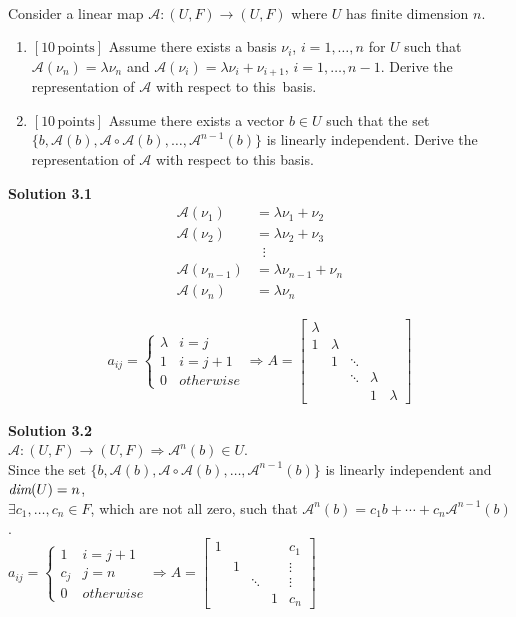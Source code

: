 \documentclass[a4paper,10.5pt]{article}
\def\dim{{\mbox{\em dim}}}
\newcommand{\A}{\mathcal{A}}
\begin{document}
\clearpage

\\
Consider a linear map $\A:(U,F) \rightarrow (U,F)$
where $U$ has finite dimension $n$. 
\begin{enumerate}
	\item {\bf$[10\, \text{points}]$} Assume there exists a basis
	$\nu_i$, $i=1, \ldots, n$ for $U$ such that ${\mathcal A}(\nu_n)=\lambda
	\nu_n$ and ${\mathcal A}(\nu_i)=\lambda \nu_i+\nu_{i+1}$, $i=1, \ldots,
	n-1$. Derive the representation of ${\mathcal A}$ with respect to this~basis.
	\item {\bf$[10\, \text{points}]$} Assume there exists a vector $b
	\in U$ such that the set $\{b, {\mathcal A}(b), {\mathcal
		A}\circ {\mathcal A}(b), \ldots, {\mathcal A}^{n-1}(b)\}$ is linearly independent. Derive the representation of ${\mathcal A}$
	with respect to this basis.\\
\end{enumerate}

{\bf Solution 3.1} \\
\begin{align*}
\A(\nu_1) &= \lambda \nu_1 + \nu_2 \\
\A(\nu_2) &= \lambda \nu_2 + \nu_3 \\
		  &\; \; \vdots \\
\A(\nu_{n-1}) &= \lambda \nu_{n-1} + \nu_n \\
\A(\nu_n) &= \lambda \nu_n
\end{align*}

\begin{align*}
a_{ij} = \begin{cases}
\lambda & i = j \\
1 & i = j + 1 \\
0 & otherwise
\end{cases} \Rightarrow A = \left[\begin{matrix}
\lambda & & & & \\
1 & \lambda & & & \\
& 1 & \ddots & & \\
& & \ddots & \lambda & \\
& & & 1 & \lambda
\end{matrix}\right]
\end{align*}


{\bf Solution 3.2} \\

$\A:(U,F) \rightarrow (U,F) \Rightarrow \A^n(b) \in U$. \\
Since the set $\{b, {\A}(b), {\A} \circ {\A}(b), \ldots, {\A}^{n-1}(b)\}$ is linearly independent and $\dim(U) = n$, \\
$\exists c_1,\dots,c_n \in F$, which are not all zero, such that $\A^n(b) = c_1b + \cdots + c_n\A^{n-1}(b)$. \\

$a_{ij} = \begin{cases}
1 & i = j + 1 \\
c_j & j = n \\
0 & otherwise
\end{cases} \Rightarrow A = \left[\begin{matrix}
1 & & & & c_1\\
& 1 & & & \vdots \\
&  & \ddots & & \vdots\\
& &  & 1 & c_n
\end{matrix}\right]$
\end{document}
